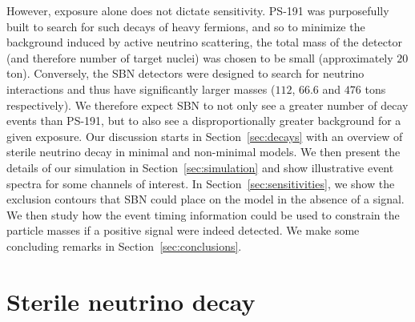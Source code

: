 \documentclass[11pt, a4paper]{article}
\newcommand{\refsec}[1]{Section~\ref{#1}}
\begin{document}
However, exposure alone does not dictate sensitivity. PS-191 was purposefully
built to search for such decays of heavy fermions, and so to minimize
the background induced by active neutrino scattering, the total mass of the
detector (and therefore number of target nuclei) was chosen to be small
(approximately $20$ ton). Conversely, the SBN detectors were designed to search
for neutrino interactions and thus have significantly larger masses ($112$,
$66.6$ and $476$ tons respectively). We therefore expect SBN to not only see a
greater number of decay events than PS-191, but to also see a disproportionally
greater background for a given exposure.
%
Our discussion starts in \refsec{sec:decays} with an overview of sterile
neutrino decay in minimal and non-minimal models. We then present the details
of our simulation in \refsec{sec:simulation} and show illustrative event
spectra for some channels of interest. In \refsec{sec:sensitivities}, we show
the exclusion contours that SBN could place on the model in the absence of a
signal. We then study how the event timing information could be used to
constrain the particle masses if a positive signal were indeed detected. We
make some concluding remarks in \refsec{sec:conclusions}.

\section{\label{sec:decays}Sterile neutrino decay}
\end{document}
